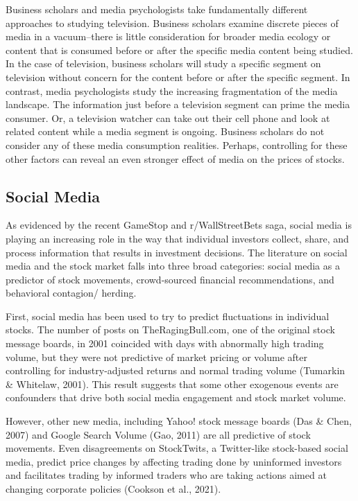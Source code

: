 \documentclass[12pt,]{article}
\begin{document}
Business scholars and media psychologists take fundamentally different
approaches to studying television. Business scholars examine discrete
pieces of media in a vacuum--there is little consideration for broader
media ecology or content that is consumed before or after the specific
media content being studied. In the case of television, business
scholars will study a specific segment on television without concern for
the content before or after the specific segment. In contrast, media
psychologists study the increasing fragmentation of the media landscape.
The information just before a television segment can prime the media
consumer. Or, a television watcher can take out their cell phone and
look at related content while a media segment is ongoing. Business
scholars do not consider any of these media consumption realities.
Perhaps, controlling for these other factors can reveal an even stronger
effect of media on the prices of stocks.

\hypertarget{social-media}{%
\subsection{Social Media}\label{social-media}}

As evidenced by the recent GameStop and r/WallStreetBets saga, social
media is playing an increasing role in the way that individual investors
collect, share, and process information that results in investment
decisions. The literature on social media and the stock market falls
into three broad categories: social media as a predictor of stock
movements, crowd-sourced financial recommendations, and behavioral
contagion/ herding.

First, social media has been used to try to predict fluctuations in
individual stocks. The number of posts on TheRagingBull.com, one of the
original stock message boards, in 2001 coincided with days with
abnormally high trading volume, but they were not predictive of market
pricing or volume after controlling for industry-adjusted returns and
normal trading volume (Tumarkin \& Whitelaw, 2001). This result suggests
that some other exogenous events are confounders that drive both social
media engagement and stock market volume.

However, other new media, including Yahoo! stock message boards (Das \&
Chen, 2007) and Google Search Volume (Gao, 2011) are all predictive of
stock movements. Even disagreements on StockTwits, a Twitter-like
stock-based social media, predict price changes by affecting trading
done by uninformed investors and facilitates trading by informed traders
who are taking actions aimed at changing corporate policies (Cookson et
al., 2021).
\end{document}
